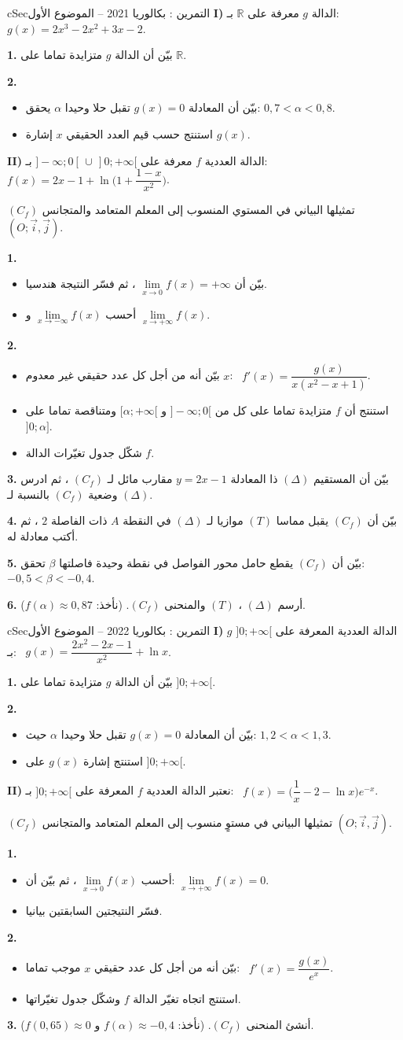 \documentclass[12pt,a4paper]{article}
\newenvironment{BOX}[2]{\begin{otherlanguage}{english}\begin{arbox}{#1}{#2}}{\end{arbox}\end{otherlanguage}}
\newcounter{exo}
\newenvironment{tamrin}[1]{\stepcounter{exo}\begin{BOX}{cSec}{التمرين \theexo: #1}}{\end{BOX}}
\newcommand{\R}{\mathbb{R}}
\newenvironment{sq}{\begin{itemize}[leftmargin=2.4em,itemsep=3pt]}{\end{itemize}}
\newcommand{\qa}{\item[(أ)]}\newcommand{\qb}{\item[(ب)]}\newcommand{\qc}{\item[(جـ)]}\newcommand{\qd}{\item[(د)]}\newcommand{\qe}{\item[(هـ)]}
\newcommand{\QQ}[1]{\par\smallskip\textbf{#1.} }
\begin{document}
\begin{tamrin}{بكالوريا 2021 -- الموضوع الأول}
\textbf{I)} الدالة $g$ معرفة على $\R$ بـ: \ $g(x)=2x^3-2x^2+3x-2$.
\QQ{1} بيّن أن الدالة $g$ متزايدة تماما على $\R$.
\QQ{2}
\begin{sq}
\qa بيّن أن المعادلة $g(x)=0$ تقبل حلا وحيدا $\alpha$ يحقق: $0{,}7<\alpha<0{,}8$.
\qb استنتج حسب قيم العدد الحقيقي $x$ إشارة $g(x)$.
\end{sq}

\textbf{II)} الدالة العددية $f$ معرفة على $]-\infty;0[\,\cup\,]0;+\infty[$ بـ: \ $f(x)=2x-1+\ln\Big(1+\dfrac{1-x}{x^2}\Big)$.

$(C_f)$ تمثيلها البياني في المستوي المنسوب إلى المعلم المتعامد والمتجانس $(O;\vec i,\vec j)$.
\QQ{1}
\begin{sq}
\qa بيّن أن $\lim\limits_{x\to0}f(x)=+\infty$ ، ثم فسّر النتيجة هندسيا.
\qb أحسب $\lim\limits_{x\to-\infty}f(x)$ و $\lim\limits_{x\to+\infty}f(x)$.
\end{sq}
\QQ{2}
\begin{sq}
\qa بيّن أنه من أجل كل عدد حقيقي غير معدوم $x$: \ $f'(x)=\dfrac{g(x)}{x(x^2-x+1)}$.
\qb استنتج أن $f$ متزايدة تماما على كل من $]-\infty;0[$ و $[\alpha;+\infty[$ ومتناقصة تماما على $]0;\alpha]$.
\qc شكّل جدول تغيّرات الدالة $f$.
\end{sq}
\QQ{3} بيّن أن المستقيم $(\Delta)$ ذا المعادلة $y=2x-1$ مقارب مائل لـ $(C_f)$ ، ثم ادرس وضعية $(C_f)$ بالنسبة لـ $(\Delta)$.
\QQ{4} بيّن أن $(C_f)$ يقبل مماسا $(T)$ موازيا لـ $(\Delta)$ في النقطة $A$ ذات الفاصلة $2$ ، ثم أكتب معادلة له.
\QQ{5} بيّن أن $(C_f)$ يقطع حامل محور الفواصل في نقطة وحيدة فاصلتها $\beta$ تحقق: $-0{,}5<\beta<-0{,}4$.
\QQ{6} أرسم $(\Delta)$ ، $(T)$ والمنحنى $(C_f)$. (نأخذ: $f(\alpha)\approx0{,}87$).
\end{tamrin}

\begin{tamrin}{بكالوريا 2022 -- الموضوع الأول}
\textbf{I)} $g$ الدالة العددية المعرفة على $]0;+\infty[$ بـ: \ $g(x)=\dfrac{2x^2-2x-1}{x^2}+\ln x$.
\QQ{1} بيّن أن الدالة $g$ متزايدة تماما على $]0;+\infty[$.
\QQ{2}
\begin{sq}
\qa بيّن أن المعادلة $g(x)=0$ تقبل حلا وحيدا $\alpha$ حيث: $1{,}2<\alpha<1{,}3$.
\qb استنتج إشارة $g(x)$ على $]0;+\infty[$.
\end{sq}

\textbf{II)} نعتبر الدالة العددية $f$ المعرفة على $]0;+\infty[$ بـ: \ $f(x)=\Big(\dfrac1x-2-\ln x\Big)e^{-x}$.

$(C_f)$ تمثيلها البياني في مستوٍ منسوب إلى المعلم المتعامد والمتجانس $(O;\vec i,\vec j)$.
\QQ{1}
\begin{sq}
\qa أحسب $\lim\limits_{x\to0}f(x)$ ، ثم بيّن أن: $\lim\limits_{x\to+\infty}f(x)=0$.
\qb فسّر النتيجتين السابقتين بيانيا.
\end{sq}
\QQ{2}
\begin{sq}
\qa بيّن أنه من أجل كل عدد حقيقي $x$ موجب تماما: \ $f'(x)=\dfrac{g(x)}{e^x}$.
\qb استنتج اتجاه تغيّر الدالة $f$ وشكّل جدول تغيّراتها.
\end{sq}
\QQ{3} أنشئ المنحنى $(C_f)$. (نأخذ: $f(\alpha)\approx-0{,}4$ و $f(0{,}65)\approx0$).
\end{tamrin}
\end{document}
